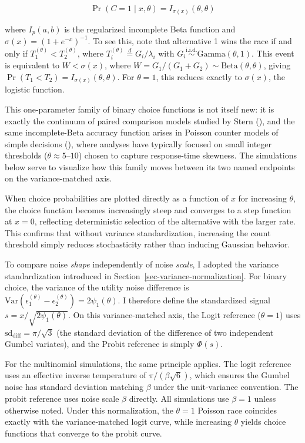 \documentclass[
  man,
  floatsintext,
  longtable,
  a4paper,
  nolmodern,
  notxfonts,
  notimes,
  colorlinks=true,linkcolor=blue,citecolor=blue,urlcolor=blue]{apa7}
\begin{document}
\[
\Pr(C = 1 \mid x, \theta) = I_{\sigma(x)}(\theta, \theta)
\]

where \(I_p(a, b)\) is the regularized incomplete Beta function and
\(\sigma(x) = (1 + e^{-x})^{-1}\). To see this, note that alternative 1
wins the race if and only if \(T_1^{(\theta)} < T_2^{(\theta)}\), where
\(T_i^{(\theta)} \stackrel{d}{=} G_i / \lambda_i\) with
\(G_i \stackrel{\text{i.i.d.}}{\sim} \text{Gamma}(\theta, 1)\). This
event is equivalent to \(W < \sigma(x)\), where
\(W = G_1 / (G_1 + G_2) \sim \text{Beta}(\theta, \theta)\), giving
\(\Pr(T_1 < T_2) = I_{\sigma(x)}(\theta, \theta)\). For \(\theta = 1\),
this reduces exactly to \(\sigma(x)\), the logistic function.

This one-parameter family of binary choice functions is not itself new:
it is exactly the continuum of paired comparison models studied by Stern
(), and the same
incomplete-Beta accuracy function arises in Poisson counter models of
simple decisions
(), where analyses have typically focused on small integer
thresholds (\(\theta \approx 5\text{–}10\)) chosen to capture
response-time skewness. The simulations below serve to visualize how
this family moves between its two named endpoints on the
variance-matched axis.

When choice probabilities are plotted directly as a function of \(x\)
for increasing \(\theta\), the choice function becomes increasingly
steep and converges to a step function at \(x = 0\), reflecting
deterministic selection of the alternative with the larger rate. This
confirms that without variance standardization, increasing the count
threshold simply reduces stochasticity rather than inducing Gaussian
behavior.

To compare noise \emph{shape} independently of noise \emph{scale}, I
adopted the variance standardization introduced in
Section~\ref{sec-variance-normalization}. For binary choice, the
variance of the utility noise difference is
\(\text{Var}(\epsilon_1^{(\theta)} - \epsilon_2^{(\theta)}) = 2\psi_1(\theta)\).
I therefore define the standardized signal
\(s = x / \sqrt{2\psi_1(\theta)}\). On this variance-matched axis, the
Logit reference (\(\theta = 1\)) uses
\(\text{sd}_{\text{diff}} = \pi/\sqrt{3}\) (the standard deviation of
the difference of two independent Gumbel variates), and the Probit
reference is simply \(\Phi(s)\).

For the multinomial simulations, the same principle applies. The logit
reference uses an effective inverse temperature of
\(\pi / (\beta\sqrt{6})\), which ensures the Gumbel noise has standard
deviation matching \(\beta\) under the unit-variance convention. The
probit reference uses noise scale \(\beta\) directly. All simulations
use \(\beta = 1\) unless otherwise noted. Under this normalization, the
\(\theta = 1\) Poisson race coincides exactly with the variance-matched
logit curve, while increasing \(\theta\) yields choice functions that
converge to the probit curve.
\end{document}
